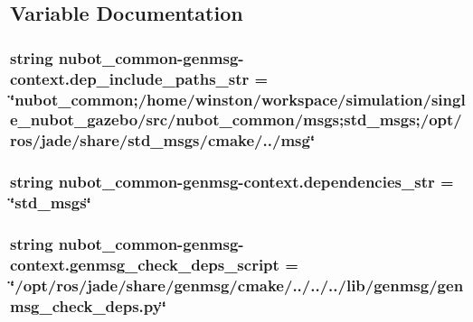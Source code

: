 \subsection{Variable Documentation}
\hypertarget{namespacenubot__common-genmsg-context_a3cb8468ce84e82ac5e2b66290f260f4c}{
\subsubsection[{dep\-\_\-include\-\_\-paths\-\_\-str}]{\setlength{\rightskip}{0pt plus 5cm}string nubot\-\_\-common-\/genmsg-\/context.\-dep\-\_\-include\-\_\-paths\-\_\-str = \char`\"{}nubot\-\_\-common;/home/winston/workspace/simulation/single\-\_\-nubot\-\_\-gazebo/src/nubot\-\_\-common/msgs;std\-\_\-msgs;/opt/ros/jade/share/std\-\_\-msgs/cmake/../msg\char`\"{}}}\label{namespacenubot__common-genmsg-context_a3cb8468ce84e82ac5e2b66290f260f4c}
\hypertarget{namespacenubot__common-genmsg-context_acb3057b57eb9458421378baa13f383d0}{
\subsubsection[{dependencies\-\_\-str}]{\setlength{\rightskip}{0pt plus 5cm}string nubot\-\_\-common-\/genmsg-\/context.\-dependencies\-\_\-str = \char`\"{}std\-\_\-msgs\char`\"{}}}\label{namespacenubot__common-genmsg-context_acb3057b57eb9458421378baa13f383d0}
\hypertarget{namespacenubot__common-genmsg-context_a32a0523eb31dd66d816b3d32bd6aa2b5}{
\subsubsection[{genmsg\-\_\-check\-\_\-deps\-\_\-script}]{\setlength{\rightskip}{0pt plus 5cm}string nubot\-\_\-common-\/genmsg-\/context.\-genmsg\-\_\-check\-\_\-deps\-\_\-script = \char`\"{}/opt/ros/jade/share/genmsg/cmake/../../../lib/genmsg/genmsg\-\_\-check\-\_\-deps.\-py\char`\"{}}}\label{namespacenubot__common-genmsg-context_a32a0523eb31dd66d816b3d32bd6aa2b5}
